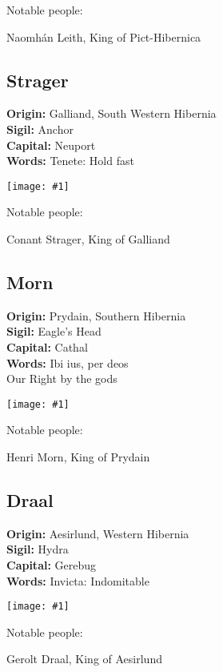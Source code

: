 \documentclass[a4paper]{dnd5}
\newcommand\inc[1]{
 \begin{center}\texttt{[image: \#1]}\end{center}
}
\newcommand\origin{\textbf{Origin: }}
\newcommand\sigil{\textbf{Sigil: }}
\newcommand\words{\textbf{Words: }}
\newcommand\wordsii{\hspace*{4em}}
\newcommand\capital{\textbf{Capital: }}
\begin{document}
Notable people:
\begin{description}
\item[Naomhán Leith, King of Pict-Hibernica]
\end{description}



\subsection{Strager}
\origin Galliand, South Western Hibernia\\
\sigil Anchor\\
\capital Neuport\\
\words Tenete: Hold fast\\
\inc{strager.png}

Notable people:
\begin{description}
\item[Conant Strager, King of Galliand]
\end{description}


\subsection{Morn}
\origin Prydain, Southern Hibernia\\
\sigil Eagle's Head\\
\capital Cathal\\
\words Ibi ius, per deos\\
\wordsii Our Right by the gods\\
\inc{morn.png}


Notable people:
\begin{description}
\item[Henri Morn, King of Prydain]
\end{description}


\subsection{Draal}
\origin Aesirlund, Western Hibernia\\
\sigil Hydra\\
\capital Gerebug\\
\words Invicta: Indomitable\\
\inc{draal.png}

Notable people:
\begin{description}
\item[Gerolt Draal, King of Aesirlund]
\end{description}
\end{document}
